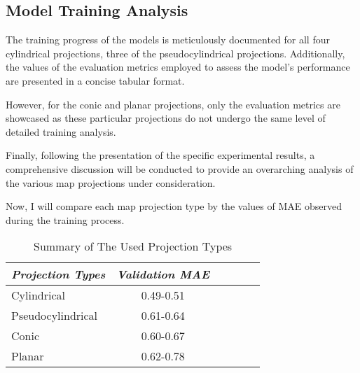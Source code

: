 \subsection{Model Training Analysis}
The training progress of the models is meticulously documented for all four cylindrical projections, three of the pseudocylindrical projections.
Additionally, the values of the evaluation metrics employed to assess the model's performance are presented in a concise tabular format.

However, for the conic and planar projections, only the evaluation metrics are showcased as these particular projections do not undergo the same level of detailed training
analysis.

Finally, following the presentation of the specific experimental results, a comprehensive discussion will be conducted to provide an overarching analysis of the
various map projections under consideration.

\clearpage

\clearpage

\clearpage


\clearpage



Now, I will compare each map projection type by the values of MAE observed during the training process.

\begin{table}[ht]
    \centering
    \caption{Summary of The Used Projection Types}
    \label{all_results_table}
    \renewcommand{\arraystretch}{1.2} %
    \begin{tabular}{|l|c|c|c|c|c|}
        \hline
        \rowcolor[gray]{0.9}
        \textbf{\emph{Projection Types}} & \textbf{\emph{Validation MAE}} \\ \hline
        Cylindrical                      & 0.49-0.51                      \\ \hline
        Pseudocylindrical                & 0.61-0.64                      \\ \hline
        Conic                            & 0.60-0.67                      \\ \hline
        Planar                           & 0.62-0.78                      \\ \hline
    \end{tabular}
\end{table}

